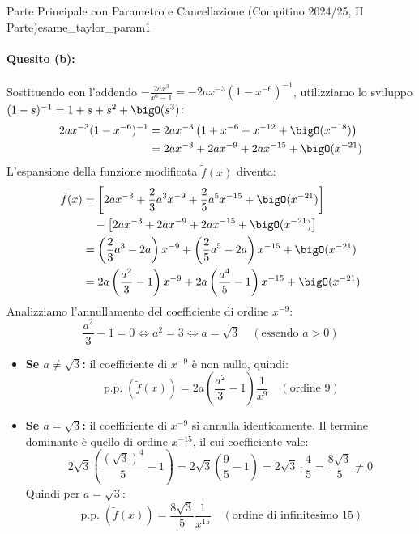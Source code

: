 \begin{esempio}{Parte Principale con Parametro e Cancellazione (Compitino 2024/25, II Parte)}{esame_taylor_param1}
\paragraph{Quesito (b):} Sostituendo con l'addendo $-\frac{2ax^3}{x^6 - 1} = -2ax^{-3}(1 - x^{-6})^{-1}$, utilizziamo lo sviluppo $(1 - s)^{-1} = 1 + s + s^2 + \bigO(s^3)$:
\begin{align*}
    2ax^{-3}(1 - x^{-6})^{-1} &= 2ax^{-3}\left(1 + x^{-6} + x^{-12} + \bigO(x^{-18})\right) \\
    &= 2ax^{-3} + 2ax^{-9} + 2ax^{-15} + \bigO(x^{-21})
\end{align*}
L'espansione della funzione modificata $\tilde{f}(x)$ diventa:
\begin{align*}
    \tilde{f}(x) &= \left[2ax^{-3} + \frac{2}{3}a^3 x^{-9} + \frac{2}{5}a^5 x^{-15} + \bigO(x^{-21})\right] \\
    &\quad - \left[2ax^{-3} + 2ax^{-9} + 2ax^{-15} + \bigO(x^{-21})\right] \\
    &= \left(\frac{2}{3}a^3 - 2a\right)x^{-9} + \left(\frac{2}{5}a^5 - 2a\right)x^{-15} + \bigO(x^{-21}) \\
    &= 2a\left(\frac{a^2}{3} - 1\right)x^{-9} + 2a\left(\frac{a^4}{5} - 1\right)x^{-15} + \bigO(x^{-21})
\end{align*}
Analizziamo l'annullamento del coefficiente di ordine $x^{-9}$:
\[
    \frac{a^2}{3} - 1 = 0 \iff a^2 = 3 \iff a = \sqrt{3} \quad (\text{essendo } a > 0)
\]
\begin{itemize}
    \item \textbf{Se $a \neq \sqrt{3}$:} il coefficiente di $x^{-9}$ è non nullo, quindi:
    \[
        \operatorname{p.p.}(\tilde{f}(x)) = 2a\left(\frac{a^2}{3} - 1\right)\frac{1}{x^9} \quad (\text{ordine } 9)
    \]
    \item \textbf{Se $a = \sqrt{3}$:} il coefficiente di $x^{-9}$ si annulla identicamente. Il termine dominante è quello di ordine $x^{-15}$, il cui coefficiente vale:
    \[
        2\sqrt{3}\left(\frac{(\sqrt{3})^4}{5} - 1\right) = 2\sqrt{3}\left(\frac{9}{5} - 1\right) = 2\sqrt{3}\cdot\frac{4}{5} = \frac{8\sqrt{3}}{5} \neq 0
    \]
    Quindi per $a = \sqrt{3}$:
    \[
        \operatorname{p.p.}(\tilde{f}(x)) = \frac{8\sqrt{3}}{5}\frac{1}{x^{15}} \quad (\text{ordine di infinitesimo } 15)
    \]
\end{itemize}
\end{esempio}

